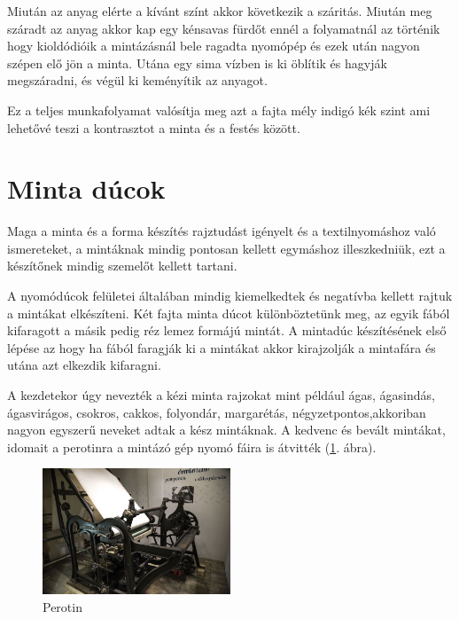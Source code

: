 Miután az anyag elérte a kívánt színt akkor következik a száritás. Miután meg száradt az anyag akkor kap egy kénsavas fürdőt ennél a folyamatnál az történik hogy kioldódióik a mintázásnál bele ragadta nyomópép és ezek után nagyon szépen elő jön a minta. Utána egy sima vízben is ki öblítik és hagyják megszáradni, és végül ki keményítik az anyagot.

Ez a teljes munkafolyamat valósítja  meg azt a fajta mély indigó kék szint ami lehetővé teszi a kontrasztot a minta és a festés között.


\section{Minta dúcok}
Maga a minta és a forma készítés rajztudást igényelt és a textilnyomáshoz való ismereteket, a mintáknak mindig pontosan kellett egymáshoz illeszkedniük, ezt a készítőnek mindig szemelőt kellett tartani.

A nyomódúcok felületei általában mindig kiemelkedtek és negatívba kellett rajtuk a mintákat elkészíteni. Két fajta minta dúcot különböztetünk meg, az egyik fából kifaragott a másik pedig réz lemez formájú mintát. A mintadúc készítésének első lépése az hogy ha fából faragják ki a mintákat akkor kirajzolják a mintafára és utána azt elkezdik kifaragni. 

A kezdetekor úgy nevezték a kézi minta rajzokat mint például ágas, ágasindás, ágasvirágos, csokros, cakkos, folyondár, margarétás, négyzetpontos,akkoriban nagyon egyszerű neveket adtak a kész mintáknak. A kedvenc és bevált mintákat, idomait a perotinra a mintázó gép nyomó fáira is átvitték (\ref{fig:perotin}. ábra).

\begin{figure}[h!]
	\centering
	\includegraphics[width=0.5\textwidth]{img/201603-perrotin.jpg}
	\caption{Perotin}
	\label{fig:perotin}
\end{figure}

